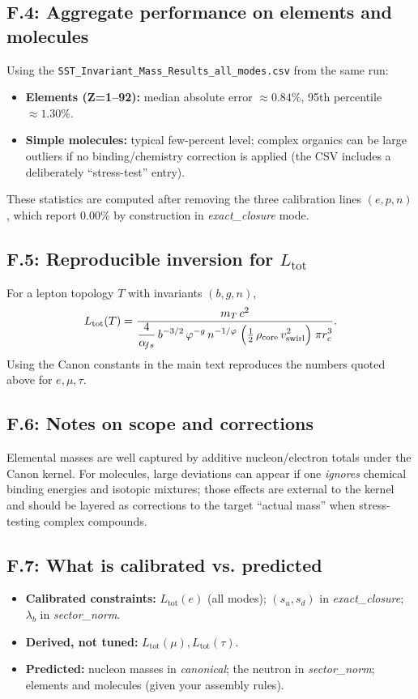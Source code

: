 \documentclass[11pt, preprint,titlepage]{revtex4-2}
\begin{document}
		\subsection*{F.4: Aggregate performance on elements and molecules}
		Using the \texttt{SST\_Invariant\_Mass\_Results\_all\_modes.csv} from the same run:
		\begin{itemize}
		\item \textbf{Elements (Z=1–92):} median absolute error \(\approx 0.84\%\), 95th percentile \(\approx 1.30\%\).
		\item \textbf{Simple molecules:} typical few-percent level; complex organics can be large outliers if no binding/chemistry correction is applied (the CSV includes a deliberately “stress-test” entry).
		\end{itemize}
		These statistics are computed after removing the three calibration lines \((e,p,n)\), which report \(0.00\%\) by construction in \textit{exact\_closure} mode.

		\subsection*{F.5: Reproducible inversion for \(L_{\text{tot}}\)}
		For a lepton topology \(T\) with invariants \((b,g,n)\),
		\[
		L_{\text{tot}}(T)
		= \frac{ m_T\,c^2 }{ \displaystyle \frac{4}{\alpha_{\!fs}}\,b^{-3/2}\,\varphi^{-g}\,n^{-1/\varphi}\;
		\Big(\tfrac12\,\rho_{\rm core}\,v_{\rm swirl}^{2}\Big)\;\pi r_c^{3} }.
		\]
		Using the Canon constants in the main text reproduces the numbers quoted above for \(e,\mu,\tau\).

		\subsection*{F.6: Notes on scope and corrections}
		Elemental masses are well captured by additive nucleon/electron totals under the Canon kernel. For molecules, large deviations can appear if one \emph{ignores} chemical binding energies and isotopic mixtures; those effects are external to the kernel and should be layered as corrections to the target “actual mass” when stress-testing complex compounds.

		\subsection*{F.7: What is calibrated vs. predicted}
		\begin{itemize}
		\item \textbf{Calibrated constraints:} \(L_{\text{tot}}(e)\) (all modes); \((s_u,s_d)\) in \textit{exact\_closure}; \(\lambda_b\) in \textit{sector\_norm}.
		\item \textbf{Derived, not tuned:} \(L_{\text{tot}}(\mu),L_{\text{tot}}(\tau)\).
		\item \textbf{Predicted:} nucleon masses in \textit{canonical}; the neutron in \textit{sector\_norm}; elements and molecules (given your assembly rules).
		\end{itemize}
\end{document}
